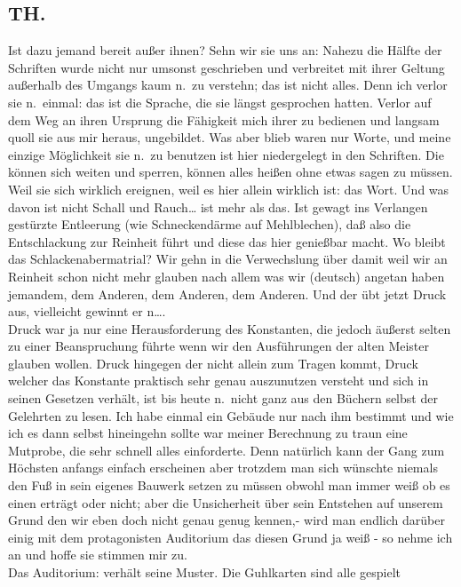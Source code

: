 \documentclass[
]{article}
\author{}
\date{\vspace{-2.5em}}
\begin{document}
\subsection{TH.}\label{th.}

Ist dazu jemand bereit außer ihnen? Sehn wir sie uns an: Nahezu die
Hälfte der Schriften wurde nicht nur umsonst geschrieben und verbreitet
mit ihrer Geltung außerhalb des Umgangs kaum n.~zu verstehn; das ist
nicht alles. Denn ich verlor sie n.~einmal: das ist die Sprache, die sie
längst gesprochen hatten. Verlor auf dem Weg an ihren Ursprung die
Fähigkeit mich ihrer zu bedienen und langsam quoll sie aus mir heraus,
ungebildet. Was aber blieb waren nur Worte, und meine einzige
Möglichkeit sie n.~zu benutzen ist hier niedergelegt in den Schriften.
Die können sich weiten und sperren, können alles heißen ohne etwas sagen
zu müssen. Weil sie sich wirklich ereignen, weil es hier allein wirklich
ist: das Wort. Und was davon ist nicht Schall und Rauch\ldots{} ist mehr
als das. Ist gewagt ins Verlangen gestürzte Entleerung (wie
Schneckendärme auf Mehlblechen), daß also die Entschlackung zur Reinheit
führt und diese das hier genießbar macht. Wo bleibt das
Schlackenabermatrial? Wir gehn in die Verwechslung über damit weil wir
an Reinheit schon nicht mehr glauben nach allem was wir (deutsch)
angetan haben jemandem, dem Anderen, dem Anderen, dem Anderen. Und der
übt jetzt Druck aus, vielleicht gewinnt er n\ldots.\\
Druck war ja nur eine Herausforderung des Konstanten, die jedoch äußerst
selten zu einer Beanspruchung führte wenn wir den Ausführungen der alten
Meister glauben wollen. Druck hingegen der nicht allein zum Tragen
kommt, Druck welcher das Konstante praktisch sehr genau auszunutzen
versteht und sich in seinen Gesetzen verhält, ist bis heute n.~nicht
ganz aus den Büchern selbst der Gelehrten zu lesen. Ich habe einmal ein
Gebäude nur nach ihm bestimmt und wie ich es dann selbst hineingehn
sollte war meiner Berechnung zu traun eine Mutprobe, die sehr schnell
alles einforderte. Denn natürlich kann der Gang zum Höchsten anfangs
einfach erscheinen aber trotzdem man sich wünschte niemals den Fuß in
sein eigenes Bauwerk setzen zu müssen obwohl man immer weiß ob es einen
erträgt oder nicht; aber die Unsicherheit über sein Entstehen auf
unserem Grund den wir eben doch nicht genau genug kennen,- wird man
endlich darüber einig mit dem protagonisten Auditorium das diesen Grund
ja weiß - so nehme ich an und hoffe sie stimmen mir zu.\\
Das Auditorium: verhält seine Muster. Die Guhlkarten sind alle gespielt
\end{document}
